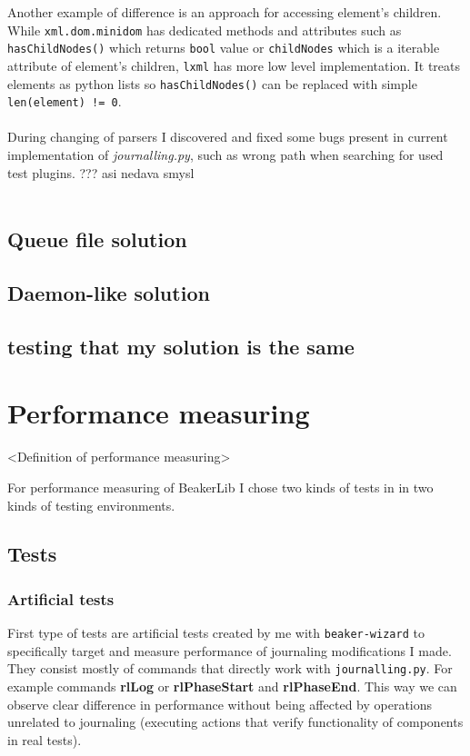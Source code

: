 Another example of difference is an approach for accessing element's children. While \texttt{xml.dom.minidom} has dedicated methods and attributes such as \texttt{hasChildNodes()} which returns \texttt{bool} value or \texttt{childNodes} which is a iterable attribute of element's children, \texttt{lxml} has more low level implementation. It treats elements as python lists so \texttt{hasChildNodes()} can be replaced with simple \texttt{len(element) != 0}.
\\
\\
During changing of parsers I discovered and fixed some bugs present in current implementation of \textit{journalling.py}, such as wrong path when searching for used test plugins. ??? asi nedava smysl
\\
\\

\section{Queue file solution}
\section{Daemon-like solution}

\section{testing that my solution is the same}

\chapter{Performance measuring}
\label{performance}
<Definition of performance measuring>

For performance measuring of BeakerLib I chose two kinds of tests in in two kinds of testing environments.

\section{Tests}

\subsection{Artificial tests}
First type of tests are artificial tests created by me with \texttt{beaker-wizard} to specifically target and measure performance of journaling modifications I made. They consist mostly of commands that directly work with \texttt{journalling.py}. For example commands \textbf{rlLog} or \textbf{rlPhaseStart} and \textbf{rlPhaseEnd}. This way we can observe clear difference in performance without being affected by operations unrelated to journaling (executing actions that verify functionality of components in real tests). 

